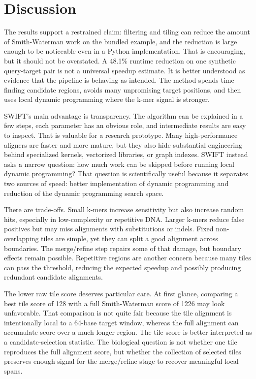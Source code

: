 \documentclass[11pt]{article}
\begin{document}
\section{Discussion}
The results support a restrained claim: filtering and tiling can reduce the amount of Smith-Waterman work on the bundled example, and the reduction is large enough to be noticeable even in a Python implementation. That is encouraging, but it should not be overstated. A 48.1\% runtime reduction on one synthetic query-target pair is not a universal speedup estimate. It is better understood as evidence that the pipeline is behaving as intended. The method spends time finding candidate regions, avoids many unpromising target positions, and then uses local dynamic programming where the k-mer signal is stronger.

SWIFT's main advantage is transparency. The algorithm can be explained in a few steps, each parameter has an obvious role, and intermediate results are easy to inspect. That is valuable for a research prototype. Many high-performance aligners are faster and more mature, but they also hide substantial engineering behind specialized kernels, vectorized libraries, or graph indexes. SWIFT instead asks a narrow question: how much work can be skipped before running local dynamic programming? That question is scientifically useful because it separates two sources of speed: better implementation of dynamic programming and reduction of the dynamic programming search space.

There are trade-offs. Small k-mers increase sensitivity but also increase random hits, especially in low-complexity or repetitive DNA. Larger k-mers reduce false positives but may miss alignments with substitutions or indels. Fixed non-overlapping tiles are simple, yet they can split a good alignment across boundaries. The merge/refine step repairs some of that damage, but boundary effects remain possible. Repetitive regions are another concern because many tiles can pass the threshold, reducing the expected speedup and possibly producing redundant candidate alignments.

The lower raw tile score deserves particular care. At first glance, comparing a best tile score of 128 with a full Smith-Waterman score of 1226 may look unfavorable. That comparison is not quite fair because the tile alignment is intentionally local to a 64-base target window, whereas the full alignment can accumulate score over a much longer region. The tile score is better interpreted as a candidate-selection statistic. The biological question is not whether one tile reproduces the full alignment score, but whether the collection of selected tiles preserves enough signal for the merge/refine stage to recover meaningful local spans.
\end{document}
